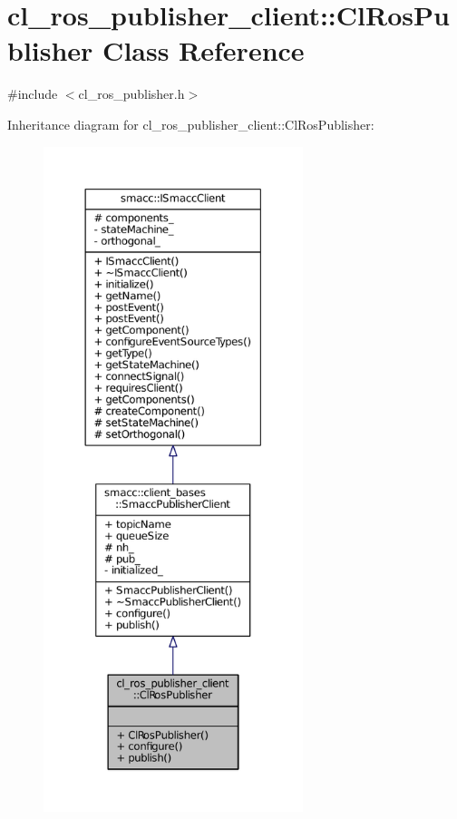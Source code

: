 \hypertarget{classcl__ros__publisher__client_1_1ClRosPublisher}{}\section{cl\+\_\+ros\+\_\+publisher\+\_\+client\+:\+:Cl\+Ros\+Publisher Class Reference}
\label{classcl__ros__publisher__client_1_1ClRosPublisher}


{\ttfamily \#include $<$cl\+\_\+ros\+\_\+publisher.\+h$>$}



Inheritance diagram for cl\+\_\+ros\+\_\+publisher\+\_\+client\+:\+:Cl\+Ros\+Publisher\+:
\nopagebreak
\begin{figure}[H]
\begin{center}
\leavevmode
\includegraphics[height=550pt]{classcl__ros__publisher__client_1_1ClRosPublisher__inherit__graph}
\end{center}
\end{figure}


